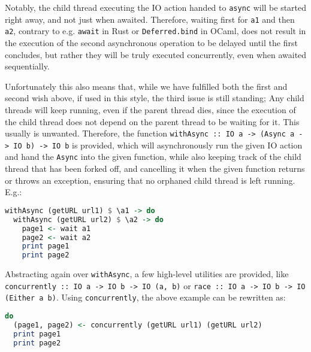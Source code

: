 \documentclass[a4paper,UKenglish,cleveref, autoref, thm-restate]{lipics-v2021}
\begin{document}
Notably, the child thread executing the IO action handed to \lstinline{async} will be started right away, and not just when awaited. Therefore, waiting first for \lstinline{a1} and then \lstinline{a2}, contrary to e.g. \lstinline{await} in Rust or \lstinline{Deferred.bind} in OCaml, does not result in the execution of the second asynchronous operation to be delayed until the first concludes, but rather they will be truly executed concurrently, even when awaited sequentially.

Unfortunately this also means that, while we have fulfilled both the first and second wish above, if used in this style, the third issue is still standing; Any child threads will keep running, even if the parent thread dies, since the execution of the child thread does not depend on the parent thread to be waiting for it\cite{ControlC47:online}. This usually is unwanted. Therefore, the function \lstinline{withAsync :: IO a -> (Async a -> IO b) -> IO b} is provided, which will asynchronously run the given IO action and hand the \lstinline{Async} into the given function, while also keeping track of the child thread that has been forked off, and cancelling it when the given function returns or throws an exception, ensuring that no orphaned child thread is left running. E.g.:

\begin{minipage}{\linewidth}
\begin{lstlisting}[language=Haskell,caption={Using withAsync to prevent orphaned threads},captionpos=t]
withAsync (getURL url1) $ \a1 -> do
  withAsync (getURL url2) $ \a2 -> do
    page1 <- wait a1
    page2 <- wait a2
    print page1
    print page2
\end{lstlisting}
\end{minipage}

Abstracting again over \lstinline{withAsync}, a few high-level utilities are provided, like \newline\lstinline{concurrently :: IO a -> IO b -> IO (a, b)} or \lstinline{race :: IO a -> IO b -> IO (Either a b)}\cite{ControlC47:online}. Using \lstinline{concurrently}, the above example can be rewritten as:

\begin{minipage}{\linewidth}
\begin{lstlisting}[language=Haskell,caption={Simplifying the example with concurrently},captionpos=t]
do
  (page1, page2) <- concurrently (getURL url1) (getURL url2)
  print page1
  print page2
\end{lstlisting}
\end{minipage}
\end{document}
